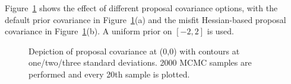 Figure~\ref{fig:rosen_prop_covar} shows the effect of different
proposal covariance options, with the default prior covariance in
Figure~\ref{fig:rosen_prop_covar}(a) and the misfit Hessian-based
proposal covariance in Figure~\ref{fig:rosen_prop_covar}(b).  A
uniform prior on $[-2,2]$ is used.
\begin{figure}[htbp]
  \begin{subfigmatrix}{2}
  \end{subfigmatrix}
  \caption{Depiction of proposal covariance at (0,0) with contours at one/two/three standard deviations.  2000 MCMC samples are performed and every 20th sample is plotted.}
\label{fig:rosen_prop_covar}
\end{figure}
